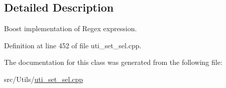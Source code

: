 \subsection{Detailed Description}
Boost implementation of Regex expression. 

Definition at line 452 of file uti\+\_\+set\+\_\+sel.\+cpp.



The documentation for this class was generated from the following file\+:\begin{DoxyCompactItemize}
\item 
src/\+Utils/\hyperlink{uti__set__sel_8cpp}{uti\+\_\+set\+\_\+sel.\+cpp}\end{DoxyCompactItemize}
